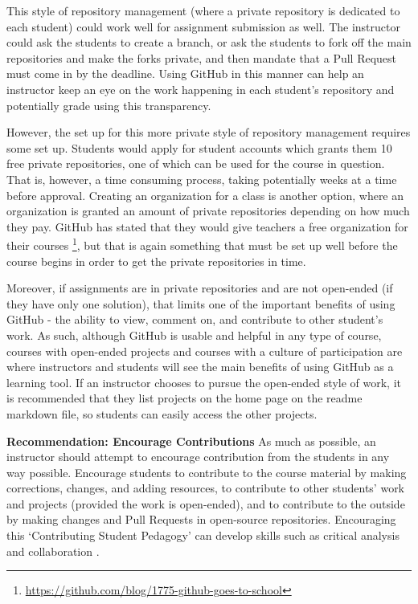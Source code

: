 This style of repository management (where a private repository is dedicated to each student) could work well for assignment submission as well. The instructor could ask the students to create a branch, or ask the students to fork off the main repositories and make the forks private, and then mandate that a Pull Request must come in by the deadline. Using GitHub in this manner can help an instructor keep an eye on the work happening in each student's repository and potentially grade using this transparency.

However, the set up for this more private style of repository management requires some set up. Students would apply for student accounts which grants them 10 free private repositories, one of which can be used for the course in question. That is, however, a time consuming process, taking potentially weeks at a time before approval. Creating an organization for a class is another option, where an organization is granted an amount of private repositories depending on how much they pay. GitHub has stated that they would give teachers a free organization for their courses \footnote{\url{https://github.com/blog/1775-github-goes-to-school}}, but that is again something that must be set up well before the course begins in order to get the private repositories in time.

Moreover, if assignments are in private repositories and are not open-ended (if they have only one solution), that limits one of the important benefits of using GitHub - the ability to view, comment on, and contribute to other student's work. As such, although GitHub is usable and helpful in any type of course, courses with open-ended projects and courses with a culture of participation are where instructors and students will see the main benefits of using GitHub as a learning tool. If an instructor chooses to pursue the open-ended style of work, it is recommended that they list projects on the home page on the readme markdown file, so students can easily access the other projects.

\textbf{Recommendation: Encourage Contributions}
As much as possible, an instructor should attempt to encourage contribution from the students in any way possible. Encourage students to contribute to the course material by making corrections, changes, and adding resources, to contribute to other students' work and projects (provided the work is open-ended), and to contribute to the outside by making changes and Pull Requests in open-source repositories. Encouraging this `Contributing Student Pedagogy' can develop skills such as critical analysis and collaboration \cite{falkner2012supporting}.

